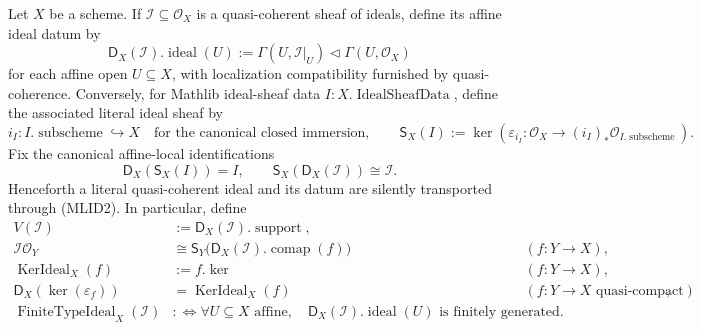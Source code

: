 \begin{definition}
  \label{def:nagata-ideal-sheaf-data-adapter}

  Let $X$ be a scheme.  If
  $\mathcal I\subseteq\mathcal O_X$ is a quasi-coherent sheaf of ideals,
  define its affine ideal datum by
  \[
    \mathsf D_X(\mathcal I).\operatorname{ideal}(U)
      :=\Gamma(U,\mathcal I|_U)
      \triangleleft\Gamma(U,\mathcal O_X)                         \tag{MLID0}
  \]
  for each affine open $U\subseteq X$, with localization compatibility
  furnished by quasi-coherence.  Conversely, for Mathlib ideal-sheaf data
  $I\colon X.\operatorname{IdealSheafData}$, define the associated literal
  ideal sheaf by
  \[
    i_I\colon I.\operatorname{subscheme}\hookrightarrow X
      \quad\text{for the canonical closed immersion},
    \qquad
    \mathsf S_X(I)
      :=\ker\!\left(
        \varepsilon_{i_I}\colon
        \mathcal O_X\longrightarrow
        (i_I)_*
          \mathcal O_{I.\operatorname{subscheme}}
      \right).                                                    \tag{MLID1}
  \]
  Fix the canonical affine-local identifications
  \[
    \mathsf D_X(\mathsf S_X(I))=I,
    \qquad
    \mathsf S_X(\mathsf D_X(\mathcal I))\cong\mathcal I.          \tag{MLID2}
  \]
  Henceforth a literal quasi-coherent ideal and its datum are silently
  transported through (MLID2).  In particular, define
  \[
  \begin{aligned}
    V(\mathcal I)&:=\mathsf D_X(\mathcal I).\operatorname{support},\\
    \mathcal I\mathcal O_Y
      &\cong\mathsf S_Y\bigl(
        \mathsf D_X(\mathcal I).\operatorname{comap}(f)\bigr)
        &&(f\colon Y\to X),\\
    \operatorname{KerIdeal}_X(f)
      &:=f.\operatorname{ker}
        &&(f\colon Y\to X),\\
    \mathsf D_X\!\left(\ker(\varepsilon_f)\right)
      &=\operatorname{KerIdeal}_X(f)
        &&(f\colon Y\to X\text{ quasi-compact}),\\
    \operatorname{FiniteTypeIdeal}_X(\mathcal I)
      &:\Longleftrightarrow
        \forall U\subseteq X\text{ affine},\quad
        \mathsf D_X(\mathcal I).\operatorname{ideal}(U)
          \text{ is finitely generated}.
  \end{aligned}                                                    \tag{MLID3}
  \]


\end{definition}
